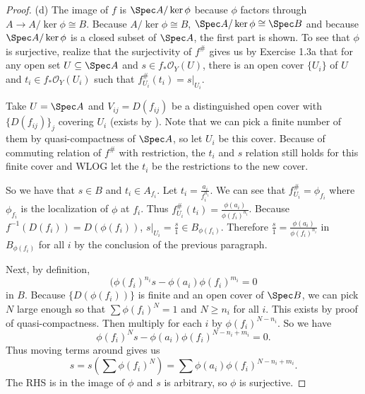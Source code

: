 \begin{proof}
	(d) The image of $f $ is $\Spec A / \ker \phi $ because $\phi  $ factors through $A \to A / \ker \phi \cong B $.
	Because $A / \ker \phi \cong B $, $\Spec A / \ker \phi \cong \Spec B $ and because $\Spec A / \ker \phi$ is a closed subset of $\Spec A $, the first part is shown.
	To see that $\phi  $ is surjective, realize that the surjectivity of $f^\# $ gives us by Exercise 1.3a that for any open set $U \subseteq \Spec A $ and $s\in f_\ast\mathcal{O}_Y(U) $, there is an open cover $\{U_i\}   $ of $U $ and $t_i \in f_\ast\mathcal{O}_Y(U_i)$ such that $f^\#_{U_i}(t_i) = s\big|_{U_i} $.

	Take $U = \Spec A $ and $V_{ij} = D(f_{ij})   $ be a distinguished open cover with $\{D(f_{ij})\}_j$ covering $U_i $ (exists by ).
	Note that we can pick a finite number of them by quasi-compactness of $\Spec A $, so let $U_i $ be this cover.
	Because of commuting relation of $f^\# $ with restriction, the $t_i $ and $s $ relation still holds for this finite cover and WLOG let the $t_i $ be the restrictions to the new cover.

	So we have that $s\in B $ and $t_i \in A_{f_i} $.
	Let $t_i = \frac{a_i}{f_i^{n_i} } $.
	We can see that $f^\#_{U_i} = \phi_{f_i}$ where $\phi _{f_i} $ is the localization of $\phi  $ at $f_i $.
	Thus $f^\#_{U_i}(t_i) = \frac{\phi (a_i)}{\phi (f_i)^{n_i} } $.
	Because $f^{-1}(D(f_i)) = D(\phi (f_i)) $, $s\big|_{U_i} = \frac{s}{1} \in B_{\phi (f_i)}$.
	Therefore $\frac{s}{1} = \frac{\phi (a_i)}{\phi (f_i)^{n_i} } $ in $B_{\phi (f_i)} $ for all $i $ by the conclusion of the previous paragraph.

	Next, by definition,
	\begin{equation}\label{eqn:2.18}
		(\phi (f_i)^{n_i}s - \phi(a_{i})\phi(f_i)^{m_i} = 0
	\end{equation}
	in $B $.
	Because $\{D(\phi (f_i))\}   $ is finite and an open cover of $\Spec B $, we can pick $N $ large enough so that $\sum \phi (f_i)^N = 1 $ and $N \ge n_i $ for all $i $.
	This exists by proof of quasi-compactness.
	Then multiply  for each $i $ by $\phi (f_i)^{N-n_i}  $.
	So we have
	\[
		\phi (f_i)^{N}s - \phi (a_i)\phi (f_i)^{N-n_i+m_i} = 0
	.\]
	Thus moving terms around gives us
	\[
		s = s\left(\sum \phi (f_i)^N\right) = \sum \phi(a_i)\phi (f_i)^{N-n_i+m_i}
	.\]
	The RHS is in the image of $\phi  $ and $s $ is arbitrary, so $\phi  $ is surjective.
\end{proof}

